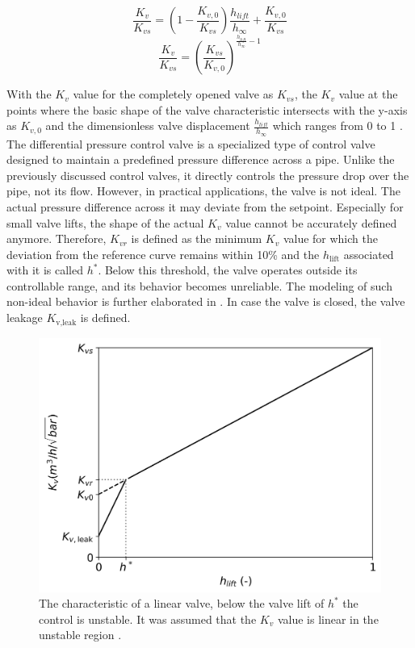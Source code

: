 \begin{equation}\label{eq::linear2valve}
    \frac{K_v}{K_{vs}} = \left( 1 -\frac{K_{v,0}}{K_{vs}} \right) \frac{h_{lift}}{h_{\infty}} + \frac{K_{v,0}}{K_{vs}}
\end{equation}
\begin{equation}\label{eq::equalpercentvalve}
    \frac{K_v}{K_{vs}} = {\left(\frac{K_{vs}}{K_{v,0}} \right)}^{\frac{h_{lift}}{h_{\infty}} - 1}
\end{equation}

With the $K_v$ value for the completely opened valve as $K_{vs}$, the $K_v$ value at the points where the basic shape of the valve characteristic intersects with the y-axis as $K_{v,0}$ and the dimensionless valve displacement $\frac{h_{lift}}{h_{\infty}}$ which ranges from 0 to 1 \cite{Artikelphdchris}. The differential pressure control valve is a specialized type of control valve designed to maintain a predefined pressure difference across a pipe. Unlike the previously discussed control valves, it directly controls the pressure drop over the pipe, not its flow. However, in practical applications, the valve is not ideal. The actual pressure difference across it may deviate from the setpoint. Especially for small valve lifts, the shape of the actual $K_v$ value cannot be accurately defined anymore. Therefore, $K_{vr}$ is defined as the minimum $K_v$ value for which the deviation from the reference curve remains within 10\% and the $h_{\text{lift}}$ associated with it is called $h^{*}$. Below this threshold, the valve operates outside its controllable range, and its behavior becomes unreliable. The modeling of such non-ideal behavior is further elaborated in \cite{echtephdthesis}. In case the valve is closed, the valve leakage $K_{\text{v,leak}}$ is defined.  

\begin{figure}[h!]
    \centering
    \includegraphics[width=0.65\linewidth]{Literature Survey - DCSC template/figuresLIT/Kvs_plot.png}
    \caption{The characteristic of a linear valve, below the valve lift of $h^*$ the control is unstable. It was assumed that the $K_v$ value is linear in the unstable region \cite{echtephdthesis}.}
    \label{fig:enter-label}
\end{figure}

